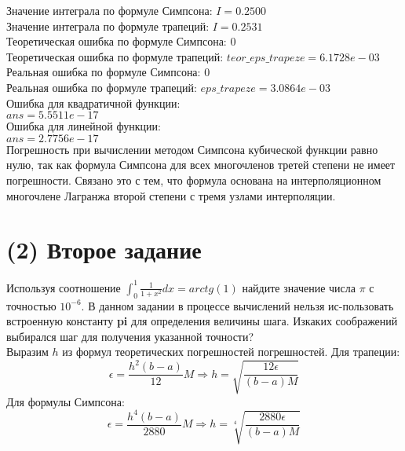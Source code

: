 Значение интеграла по формуле Симпсона: $I = 0.2500$\\
Значение интеграла по формуле трапеций: $I = 0.2531$\\
Теоретическая ошибка по формуле Симпсона: $0$\\
Теоретическая ошибка по формуле трапеций: $teor\_eps\_trapeze = 6.1728e-03$\\
Реальная ошибка по формуле Симпсона: $0$\\
Реальная ошибка по формуле трапеций: $eps\_trapeze = 3.0864e-03$\\
Ошибка для квадратичной функции:\\
$ans = 5.5511e-17$\\
Ошибка для линейной функции:\\
$ans = 2.7756e-17$\\

Погрешность при вычислении методом Симпсона кубической функции равно нулю, так как формула Симпсона для всех многочленов третей степени не имеет погрешности. Связано это с тем, что формула основана на интерполяционном многочлене Лагранжа второй степени с тремя узлами интерполяции.

\section{(2) Второе задание}
Используя соотношение $\int_{0}^{1}\frac{1}{1+x^{2}}dx = arctg(1)$ найдите значение числа $\pi$ с точностью $10^{-6}$. В данном задании в процессе вычислений нельзя ис-пользовать встроенную константу \textbf{pi} для определения величины шага. Изкаких соображений выбирался шаг для получения указанной точности?\\[2mm]
Выразим $h$ из формул теоретических погрешностей погрешностей. Для трапеции:
\[
  \epsilon = \frac{h^{2}(b-a)}{12}M \Rightarrow h = \sqrt{\frac{12\epsilon}{(b-a)M}}
\]
Для формулы Симпсона:
\[
  \epsilon = \frac{h^{4}(b-a)}{2880}M \Rightarrow h = \sqrt[4]{\frac{2880\epsilon}{(b-a)M}}
\]

